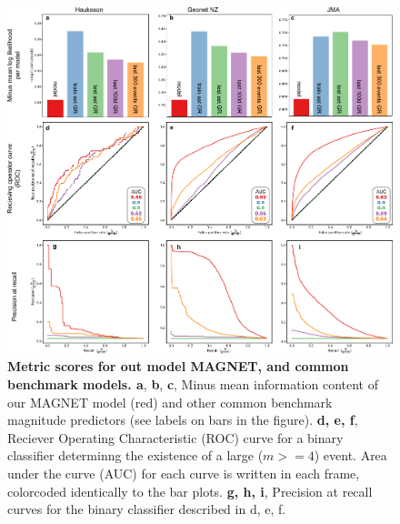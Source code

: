\documentclass[pdflatex]{sn-jnl}
\begin{document}
\begin{figure}[h!]
    \centering
    \includegraphics[width=1\textwidth]{figures/combined_batplots.pdf}
    \caption{
        \textbf{Metric scores for out model MAGNET, and common benchmark models. a}, \textbf{b}, \textbf{c}, Minus mean information content of our MAGNET model (red) and other common benchmark magnitude predictors (see labels on bars in the figure). \textbf{d, e, f}, Reciever Operating Characteristic (ROC) curve for a binary classifier determinng the existence of a large ($m>=4$) event. Area under the curve (AUC) for each curve is written in each frame, colorcoded identically to the bar plots. \textbf{g, h, i}, Precision at recall curves for the binary classifier described in d, e, f. 
        }
        \label{fig:metrics}
\end{figure}
\end{document}

